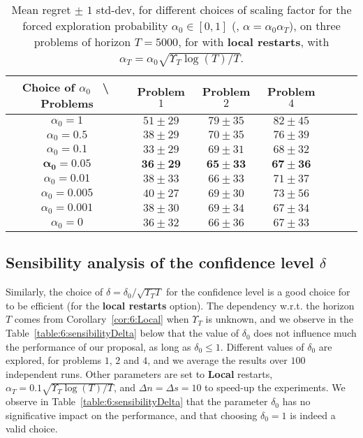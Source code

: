 \begin{small} %
\begin{table}[ht]
    \begin{small} %
    \centering
    \begin{tabular}{c|cccccc}
        \textbf{Choice of} $\alpha_0$ $\;$ \textbackslash $\;$ \textbf{Problems} & Problem $1$ & Problem $2$ & Problem $4$ \\
        \hline
        $\alpha_0=1$     & $51 \pm 29$ & $79 \pm 35$ & $82 \pm 45$ \\
        $\alpha_0=0.5$   & $38 \pm 29$ & $70 \pm 35$ & $76 \pm 39$ \\
        $\alpha_0=0.1$   & $33 \pm 29$ & $69 \pm 31$ & $68 \pm 32$ \\
        $\mathbf{\alpha_0=0.05}$  & $\mathbf{36 \pm 29}$ & $\mathbf{65 \pm 33}$ & $\mathbf{67 \pm 36}$ \\
        $\alpha_0=0.01$  & $38 \pm 33$ & $66 \pm 33$ & $71 \pm 37$ \\
        $\alpha_0=0.005$ & $40 \pm 27$ & $69 \pm 30$ & $73 \pm 56$ \\
        $\alpha_0=0.001$ & $38 \pm 30$ & $69 \pm 34$ & $67 \pm 34$ \\
        $\alpha_0=0$     & $36 \pm 32$ & $66 \pm 36$ & $67 \pm 33$
    \end{tabular}
    \caption{Mean regret $\pm$ $1$ std-dev, for different choices of scaling factor for the forced exploration probability $\alpha_0\in[0,1]$ (\ie, $\alpha=\alpha_0 \alpha_T$), on three problems of horizon $T=5000$, for \GLRklUCB{} with \textbf{local restarts}, with $\alpha_T = \alpha_0\sqrt{\Upsilon_T \log(T)/T}$.}
    \label{table:6:sensibilityAlpha0}
    \end{small} %
\end{table}
\end{small} %


\subsection{Sensibility analysis of the confidence level $\delta$}\label{sec:6:choosingDelta}

Similarly, the choice of $\delta=\delta_0 / \sqrt{\Upsilon_T T}$ for the confidence level is a good choice for \GLRklUCB{} to be efficient (for the \textbf{local restarts} option).
The dependency w.r.t. the horizon $T$ comes from Corollary~\ref{cor:6:Local} when $\Upsilon_T$ is unknown, and we observe in the Table~\ref{table:6:sensibilityDelta} below that the value of $\delta_0$ does not influence much the performance of our proposal, as long as $\delta_0\leq1$.
Different values of $\delta_0$ are explored, for problems $1$, $2$ and $4$, and we average the results over $100$ independent runs.
Other parameters are set to \textbf{Local} restarts, $\alpha_T = 0.1 \sqrt{\Upsilon_T\log(T)/T}$, and $\Delta n = \Delta s = 10$ to speed-up the experiments.
%
We observe in Table~\ref{table:6:sensibilityDelta} that the parameter $\delta_0$ has no significative impact on the performance,
and that choosing $\delta_0 = 1$ is indeed a valid choice.

